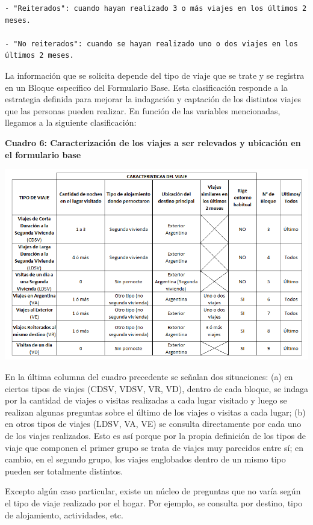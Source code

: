 \documentclass[
  openany]{book}
\begin{document}
\begin{verbatim}
- "Reiterados": cuando hayan realizado 3 o más viajes en los últimos 2 meses.

- "No reiterados": cuando se hayan realizado uno o dos viajes en los últimos 2 meses.
\end{verbatim}

La información que se solicita depende del tipo de viaje que se trate y se registra en un Bloque específico del Formulario Base. Esta clasificación responde a la estrategia definida para mejorar la indagación y captación de los distintos viajes que las personas pueden realizar. En función de las variables mencionadas, llegamos a la siguiente clasificación:

\textbf{Cuadro 6: Caracterización de los viajes a ser relevados y ubicación en el formulario base}

\includegraphics{cuadros_graficos/08_caracterizacion_de_los_viajes.png}

En la última columna del cuadro precedente se señalan dos situaciones: (a) en ciertos tipos de viajes (CDSV, VDSV, VR, VD), dentro de cada bloque, se indaga por la cantidad de viajes o visitas realizadas a cada lugar visitado y luego se realizan algunas preguntas sobre el último de los viajes o visitas a cada lugar; (b) en otros tipos de viajes (LDSV, VA, VE) se consulta directamente por cada uno de los viajes realizados. Esto es así porque por la propia definición de los tipos de viaje que componen el primer grupo se trata de viajes muy parecidos entre sí; en cambio, en el segundo grupo, los viajes englobados dentro de un mismo tipo pueden ser totalmente distintos.

Excepto algún caso particular, existe un núcleo de preguntas que no varía según el tipo de viaje realizado por el hogar. Por ejemplo, se consulta por destino, tipo de alojamiento, actividades, etc.
\end{document}
